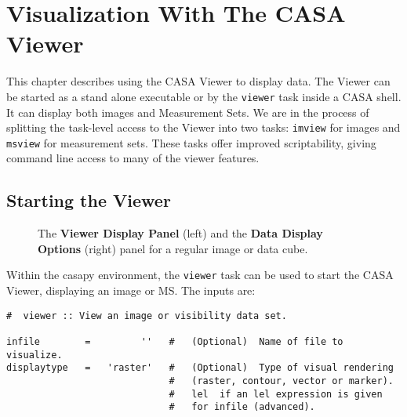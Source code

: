 

\chapter{Visualization With The CASA Viewer}
\label{chapter:display}

This chapter describes using the CASA Viewer to display data.
The Viewer can be started as a stand alone executable or by the
{\tt viewer} task inside a CASA shell. It can display both images and Measurement Sets. 
We are in the process of splitting the task-level access to the Viewer into 
two tasks: {\tt imview} for images and {\tt msview} for measurement 
sets. These tasks offer improved scriptability, giving command
line access to many of the viewer features. 


\section{Starting the Viewer}
\label{section:display.start}

\begin{figure}[h!]
\begin{center}
\caption{\label{fig:viewer_start} The {\bf Viewer Display Panel} (left) and 
the {\bf Data Display Options} (right) panel for a regular image or data cube.}
\hrulefill
\end{center}
\end{figure}

Within the casapy environment, the {\tt viewer} task
can be used to start the CASA Viewer, displaying an image or MS.  The inputs are:
\small
\begin{verbatim}
#  viewer :: View an image or visibility data set.

infile        =         ''   #   (Optional)  Name of file to visualize.
displaytype   =   'raster'   #   (Optional)  Type of visual rendering
                             #   (raster, contour, vector or marker).
                             #   lel  if an lel expression is given
                             #   for infile (advanced).

\end{verbatim}
\normalsize

